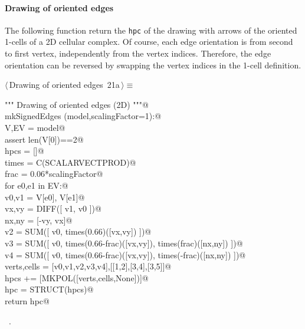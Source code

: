 \documentclass[11pt,oneside]{article}    %
\begin{document}
\paragraph{Drawing of oriented edges}
The following function return the \texttt{hpc} of the drawing with arrows of the oriented 1-cells of a 2D cellular complex. Of course, each edge orientation is from second to first vertex, independently from the vertex indices. Therefore, the edge orientation can be reversed by swapping the vertex indices in the 1-cell definition. 
\begin{flushleft} \small \label{scrap34}
\protect{}$\langle\,$Drawing of oriented edges\nobreak\ {\footnotesize 21a}$\,\rangle\equiv$
\vspace{-1ex}
\begin{list}{}{} \item
\mbox{}\verb@""" Drawing of oriented edges (2D) """@\\
\mbox{}\verb@def mkSignedEdges (model,scalingFactor=1):@\\
\mbox{}\verb@    V,EV = model@\\
\mbox{}\verb@    assert len(V[0])==2@\\
\mbox{}\verb@    hpcs = []@\\
\mbox{}\verb@    times = C(SCALARVECTPROD)@\\
\mbox{}\verb@    frac = 0.06*scalingFactor@\\
\mbox{}\verb@    for e0,e1 in EV:@\\
\mbox{}\verb@        v0,v1 = V[e0], V[e1]@\\
\mbox{}\verb@        vx,vy = DIFF([ v1, v0 ])@\\
\mbox{}\verb@        nx,ny = [-vy, vx]@\\
\mbox{}\verb@        v2 = SUM([ v0, times(0.66)([vx,vy]) ])@\\
\mbox{}\verb@        v3 = SUM([ v0, times(0.66-frac)([vx,vy]), times(frac)([nx,ny]) ])@\\
\mbox{}\verb@        v4 = SUM([ v0, times(0.66-frac)([vx,vy]), times(-frac)([nx,ny]) ])@\\
\mbox{}\verb@        verts,cells = [v0,v1,v2,v3,v4],[[1,2],[3,4],[3,5]]@\\
\mbox{}\verb@        hpcs += [MKPOL([verts,cells,None])]@\\
\mbox{}\verb@    hpc = STRUCT(hpcs)@\\
\mbox{}\verb@    return hpc@\\
\mbox{}\verb@@{\NWsep}
\end{list}
\vspace{-1ex}
\footnotesize\addtolength{\baselineskip}{-1ex}
\begin{list}{}{\setlength{\itemsep}{-\parsep}\setlength{\itemindent}{-\leftmargin}}
\item \NWtxtMacroRefIn\ .
\end{list}
\end{flushleft}
\end{document}
